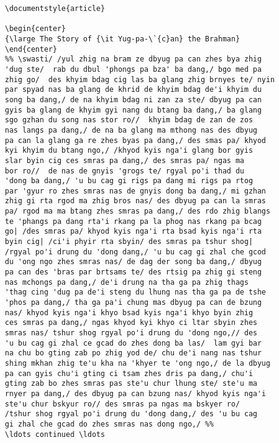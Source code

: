 
\begin{verbatim}
\documentstyle{article}

\begin{center}
{\large The Story of {\it Yug-pa-\`{c}an} the Brahman}
\end{center}
%% \swasti/ /yul zhig na bram ze dbyug pa can zhes bya zhig 
'dug ste/  rab du dbul 'phongs pa bza' ba dang,/ bgo med pa 
zhig go/  des khyim bdag cig las ba glang zhig brnyes te/ nyin 
par spyad nas ba glang de khrid de khyim bdag de'i khyim du 
song ba dang,/ de na khyim bdag ni zan za ste/ dbyug pa can 
gyis ba glang de khyim gyi nang du btang ba dang,/ ba glang 
sgo gzhan du song nas stor ro//  khyim bdag de zan de zos 
nas langs pa dang,/ de na ba glang ma mthong nas des dbyug 
pa can la glang ga re zhes byas pa dang,/ des smas pa/ khyod 
kyi khyim du btang ngo,/ /khyod kyis nga'i glang bor gyis 
slar byin cig ces smras pa dang,/ des smras pa/ ngas ma 
bor ro//  de nas de gnyis 'grogs te/ rgyal po'i thad du 
'dong ba dang,/ 'u bu cag gi rigs pa dang mi rigs pa rtog 
par 'gyur ro zhes smras nas de gnyis dong ba dang,/ mi gzhan 
zhig gi rta rgod ma zhig bros nas/ des dbyug pa can la smras 
pa/ rgod ma ma btang zhes smras pa dang,/ des rdo zhig blangs 
te 'phangs pa dang rta'i rkang pa la phog nas rkang pa bcag 
go| /des smras pa/ khyod kyis nga'i rta bsad kyis nga'i rta 
byin cig| /ci'i phyir rta sbyin/ des smras pa tshur shog| 
/rgyal po'i drung du 'dong dang,/ 'u bu cag gi zhal che gcod 
du 'ong ngo zhes smras nas/ de dag der song ba dang,/ dbyug 
pa can des 'bras par brtsams te/ des rtsig pa zhig gi steng 
nas mchongs pa dang,/ de'i drung na tha ga pa zhig thags 
'thag cing 'dug pa de'i steng du lhung nas tha ga pa de tshe 
'phos pa dang,/ tha ga pa'i chung mas dbyug pa can de bzung 
nas/ khyod kyis nga'i khyo bsad kyis nga'i khyo byin zhig 
ces smras pa dang,/ ngas khyod kyi khyo ci ltar sbyin zhes 
smras nas/ tshur shog rgyal po'i drung du 'dong ngo,// des 
'u bu cag gi zhal ce gcad do zhes dong ba las/  lam gyi bar 
na chu bo gting zab po zhig yod de/ chu de'i nang nas tshur 
shing mkhan zhig te'u kha na 'khyer te 'ong ngo,/ de la dbyug 
pa can gyis chu'i gting ci tsam zhes dris pa dang,/ chu'i 
gting zab bo zhes smras pas ste'u chur lhung ste/ ste'u ma
rnyer pa dang,/ des dbyug pa can bzung nas/ khyod kyis nga'i 
ste'u chur bskyur ro// des smras pa ngas ma bskyer ro/ 
/tshur shog rgyal po'i drung du 'dong dang,/ des 'u bu cag 
gi zhal che gcad do zhes smras nas dong ngo,/ %%  
\ldots continued \ldots 
 
\end{verbatim}

